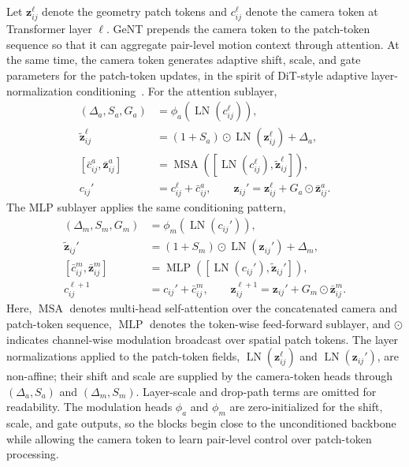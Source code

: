 Let $\bm{z}_{ij}^{\ell}$ denote the geometry patch tokens and $c_{ij}^{\ell}$ denote the camera token at Transformer layer $\ell$.
GeNT prepends the camera token to the patch-token sequence so that it can aggregate pair-level motion context through attention.
At the same time, the camera token generates adaptive shift, scale, and gate parameters for the patch-token updates, in the spirit of DiT-style adaptive layer-normalization conditioning~\cite{peebles2023scalable}.
For the attention sublayer,
\begin{equation}
\begin{aligned}
    (\Delta_a,S_a,G_a) &= \phi_a\!\left(\operatorname{LN}(c_{ij}^{\ell})\right), \\
    \tilde{\bm{z}}_{ij}^{\ell} &=
    (1+S_a)\odot \operatorname{LN}(\bm{z}_{ij}^{\ell})+\Delta_a, \\
    [\bar c_{ij}^{a},\bar{\bm{z}}_{ij}^{a}]
    &= \operatorname{MSA}\!\left(
        [\operatorname{LN}(c_{ij}^{\ell}),\tilde{\bm{z}}_{ij}^{\ell}]
    \right), \\
    c_{ij}' &= c_{ij}^{\ell}+\bar c_{ij}^{a}, \qquad
    \bm{z}_{ij}' =
    \bm{z}_{ij}^{\ell}+G_a\odot\bar{\bm{z}}_{ij}^{a}.
\end{aligned}
\label{eq:geont_camera_token_attention}
\end{equation}
The MLP sublayer applies the same conditioning pattern,
\begin{equation}
\begin{aligned}
    (\Delta_m,S_m,G_m) &= \phi_m\!\left(\operatorname{LN}(c_{ij}')\right), \\
    \tilde{\bm{z}}_{ij}' &=
    (1+S_m)\odot \operatorname{LN}(\bm{z}_{ij}')+\Delta_m, \\
    [\bar c_{ij}^{m},\bar{\bm{z}}_{ij}^{m}]
    &= \operatorname{MLP}\!\left(
        [\operatorname{LN}(c_{ij}'),\tilde{\bm{z}}_{ij}']
    \right), \\
    c_{ij}^{\ell+1} &= c_{ij}'+\bar c_{ij}^{m}, \qquad
    \bm{z}_{ij}^{\ell+1} =
    \bm{z}_{ij}'+G_m\odot\bar{\bm{z}}_{ij}^{m}.
\end{aligned}
\label{eq:geont_camera_token_mlp}
\end{equation}
Here, $\operatorname{MSA}$ denotes multi-head self-attention over the concatenated camera and patch-token sequence, $\operatorname{MLP}$ denotes the token-wise feed-forward sublayer, and $\odot$ indicates channel-wise modulation broadcast over spatial patch tokens.
The layer normalizations applied to the patch-token fields, $\operatorname{LN}(\bm{z}_{ij}^{\ell})$ and $\operatorname{LN}(\bm{z}_{ij}')$, are non-affine; their shift and scale are supplied by the camera-token heads through $(\Delta_a,S_a)$ and $(\Delta_m,S_m)$.
Layer-scale and drop-path terms are omitted for readability.
The modulation heads $\phi_a$ and $\phi_m$ are zero-initialized for the shift, scale, and gate outputs, so the blocks begin close to the unconditioned backbone while allowing the camera token to learn pair-level control over patch-token processing.

